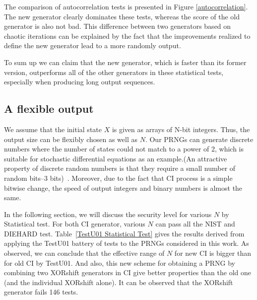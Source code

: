 The comparison of autocorrelation tests is presented in Figure \ref{autocorrelation}. The new generator clearly dominates these tests, whereas the score of the old generator is also not bad. This difference between two generators based on chaotic iterations can be explained by the fact that the improvements realized to define the new generator lead to a more randomly output.

To sum up we can claim that the new generator, which is faster than its former version, outperforms all of the other generators in these statistical tests, especially when producing long output sequences.




\subsection{A flexible output}

We assume that the initial state $X$ is given as arrays of N-bit integers. Thus, the output size can be flexibly chosen  as well as $N$. Our PRNGs can generate discrete numbers
where the number of states could not match to a power of 2, which is suitable for stochastic differential equations as an example.(An attractive property of discrete random numbers is that they
require a small number of random bits--3 bits)~\cite{Ladd20092140}.
Moreover, due to the fact that CI process is a simple bitwise change, the speed of output integers and binary numbers is almost the same. 

In the following section, we will discuss the security level for various $N$ by Statistical test.
For both CI generator, various $N$ can pass all the NIST and DIEHARD test. Table~\ref{TestU01 Statistical Test} gives the results derived from applying the TestU01 battery of tests to the PRNGs considered in this work. As observed,  we can conclude that the effective range of $N$ for new CI is bigger than for old CI by TestU01. And also, this new scheme for obtaining a PRNG by combining two XORshift generators in CI give better properties than the old one (and the individual XORshift alone). It can be observed that the XORshift generator fails 146 tests.

